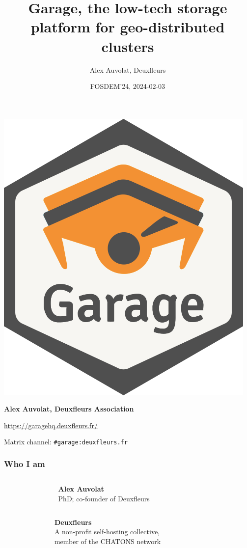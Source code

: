 \documentclass[aspectratio=169,xcolor={svgnames}]{beamer}
\title{Garage, the low-tech storage platform for geo-distributed clusters}
\author{Alex Auvolat, Deuxfleurs}
\date{FOSDEM'24, 2024-02-03}
\begin{document}
\begin{frame}
	\centering
	\includegraphics[width=.3\linewidth]{../../sticker/Garage.png}
	\vspace{1em}

	{\large\bf Alex Auvolat, Deuxfleurs Association}
	\vspace{1em}

	\url{https://garagehq.deuxfleurs.fr/}

	Matrix channel: \texttt{\#garage:deuxfleurs.fr}
\end{frame}

\begin{frame}
	\frametitle{Who I am}
	\begin{columns}[t]
		\begin{column}{.2\textwidth}
			\centering
		\end{column}
		\begin{column}{.6\textwidth}
			\textbf{Alex Auvolat}\\
			PhD; co-founder of Deuxfleurs
		\end{column}
		\begin{column}{.2\textwidth}
			~
		\end{column}
	\end{columns}
	\vspace{2em}

	\begin{columns}[t]
		\begin{column}{.2\textwidth}
			\centering
		\end{column}
		\begin{column}{.6\textwidth}
			\textbf{Deuxfleurs}\\
			A non-profit self-hosting collective,\\
			member of the CHATONS network
		\end{column}
		\begin{column}{.2\textwidth}
			\centering
		\end{column}
	\end{columns}

\end{frame}
\end{document}
